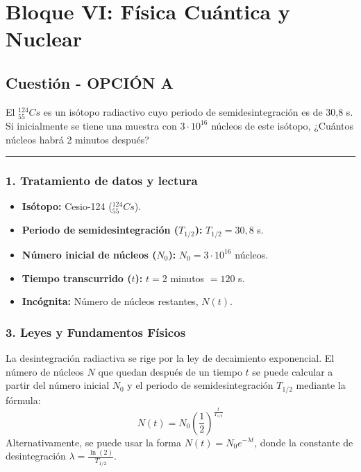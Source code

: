 \newpage

\section{Bloque VI: Física Cuántica y Nuclear}
\label{sec:cuantica_nuclear_2011_sep_ext}

\subsection{Cuestión - OPCIÓN A}
\label{subsec:6A_2011_sep_ext}

\begin{cajaenunciado}
El ${}^{124}_{55}Cs$ es un isótopo radiactivo cuyo periodo de semidesintegración es de 30,8 s. Si inicialmente se tiene una muestra con $3\cdot10^{16}$ núcleos de este isótopo, ¿Cuántos núcleos habrá 2 minutos después?
\end{cajaenunciado}
\hrule

\subsubsection*{1. Tratamiento de datos y lectura}
\begin{itemize}
    \item \textbf{Isótopo:} Cesio-124 (${}^{124}_{55}Cs$).
    \item \textbf{Periodo de semidesintegración ($T_{1/2}$):} $T_{1/2} = 30,8$ s.
    \item \textbf{Número inicial de núcleos ($N_0$):} $N_0 = 3 \cdot 10^{16}$ núcleos.
    \item \textbf{Tiempo transcurrido ($t$):} $t = 2$ minutos $= 120$ s.
    \item \textbf{Incógnita:} Número de núcleos restantes, $N(t)$.
\end{itemize}

\subsubsection*{3. Leyes y Fundamentos Físicos}
La desintegración radiactiva se rige por la ley de decaimiento exponencial. El número de núcleos $N$ que quedan después de un tiempo $t$ se puede calcular a partir del número inicial $N_0$ y el periodo de semidesintegración $T_{1/2}$ mediante la fórmula:
$$N(t) = N_0 \left(\frac{1}{2}\right)^{\frac{t}{T_{1/2}}}$$
Alternativamente, se puede usar la forma $N(t) = N_0 e^{-\lambda t}$, donde la constante de desintegración $\lambda = \frac{\ln(2)}{T_{1/2}}$.


